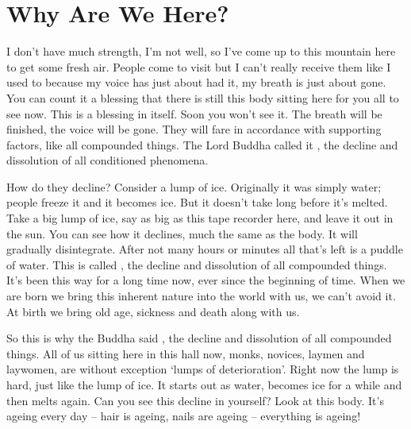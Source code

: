 
\chapter{Why Are We Here?}

\vspace*{0.5\baselineskip}
 I don't have much strength, I'm not well, so I've come up to this mountain here to get some fresh air. People come to visit but I can't really receive them like I used to because my voice has just about had it, my breath is just about gone. You can count it a blessing that there is still this body sitting here for you all to see now. This is a blessing in itself. Soon you won't see it. The breath will be finished, the voice will be gone. They will fare in accordance with supporting factors, like all compounded things. The Lord Buddha called it , the decline and dissolution of all conditioned phenomena. 

How do they decline? Consider a lump of ice. Originally it was simply water; people freeze it and it becomes ice. But it doesn't take long before it's melted. Take a big lump of ice, say as big as this tape recorder here, and leave it out in the sun. You can see how it declines, much the same as the body. It will gradually disintegrate. After not many hours or minutes all that's left is a puddle of water. This is called , the decline and dissolution of all compounded things. It's been this way for a long time now, ever since the beginning of time. When we are born we bring this inherent nature into the world with us, we can't avoid it. At birth we bring old age, sickness and death along with us.

So this is why the Buddha said , the decline and dissolution of all compounded things. All of us sitting here in this hall now, monks, novices, laymen and laywomen, are without exception `lumps of deterioration'. Right now the lump is hard, just like the lump of ice. It starts out as water, becomes ice for a while and then melts again. Can you see this decline in yourself? Look at this body. It's ageing every day -- hair is ageing, nails are ageing -- everything is ageing! 

